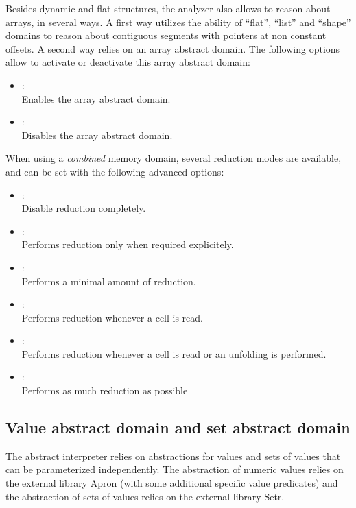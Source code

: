 Besides dynamic and flat structures, the \memcad analyzer also allows
to reason about arrays, in several ways.
A first way utilizes the ability of ``flat'', ``list'' and ``shape''
domains to reason about contiguous segments with pointers at non constant
offsets.
A second way relies on an array abstract domain. %
The following options allow to activate or deactivate this array abstract
domain:
\label{opt:arrayd}
\begin{itemize}
\item[\doption{-array-on}]: \\
  Enables the array abstract domain.
\item[\doption{-array-off}]: \\
  Disables the array abstract domain.
\end{itemize}

When using a {\em combined} memory domain, several reduction modes are
available, and can be set with the following advanced options: %
\label{opt:reduct}
\begin{itemize}
\item[\doption{-red-disabled}]: \\
  Disable reduction completely.
\item[\doption{-red-manual}]: \\
  Performs reduction only when required explicitely.
\item[\doption{-red-min}]: \\
  Performs a minimal amount of reduction. %
\item[\doption{-red-on-read}]: \\
  Performs reduction whenever a cell is read.
\item[\doption{-red-on-r-u}]: \\
  Performs reduction whenever a cell is read or an unfolding is performed.
\item[\doption{-red-max}]: \\
  Performs as much reduction as possible
\end{itemize}

\subsection{Value abstract domain and set abstract domain}
\label{s:opt:vsd}
The \memcad abstract interpreter relies on abstractions for values and
sets of values that can be parameterized independently.
The abstraction of numeric values relies on the external library Apron
(with some additional \memcad specific value predicates) and the
abstraction of sets of values relies on the external library Setr.

